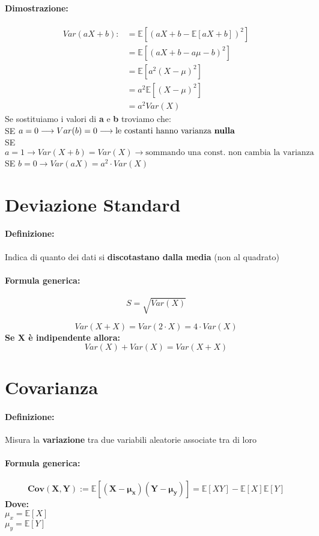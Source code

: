 \documentclass[]{article}
\newcommand{\ev}{\mathbb{E}[X]}
\renewcommand{\ev}[1]{\mathbb{E}[#1]}
\newcommand{\definizione}{\paragraph{Definizione:}}
\newcommand{\formula}{\paragraph{Formula generica:}}
\begin{document}
    \paragraph{Dimostrazione:}
    \begin{equation*}
        \begin{split}
            Var(aX + b) :&= \ev{(aX + b - \ev{aX + b})^2} \\
            & = \ev{(aX + b -a\mu - b)^2} \\
            & = \ev{a^2(X-\mu)^2} \\
            & = a^2 \ev{(X - \mu)^2} \\
            & = a^2 Var(X)
        \end{split}
    \end{equation*}
    Se sostituiamo i valori di \textbf{a} e \textbf{b} troviamo che: \\
    SE $a = 0 \longrightarrow Var(b) = 0 \longrightarrow \text{le costanti hanno varianza \textbf{nulla}}$ \\
    SE $a = 1 \longrightarrow Var(X + b) = Var(X) \longrightarrow \text{sommando una const. non cambia la varianza}$ \\
    SE $b = 0 \longrightarrow Var(aX) = a^2 \cdot Var(X)$ \\
    

    \newpage
    \section{Deviazione Standard}
    \definizione Indica di quanto dei dati si \textbf{discotastano dalla media} (non al quadrato)

    \formula \[ S = \sqrt{Var(X)} \]

    \[ Var(X + X) = Var(2 \cdot X) = 4 \cdot Var(X) \]
    \linebreak[1]
    \textbf{Se X è indipendente allora:}
    \[ Var(X) + Var(X) = Var(X + X) \]

    \section{Covarianza}
    \definizione Misura la \textbf{variazione} tra due variabili aleatorie associate tra di loro
    \formula \[ \boldsymbol{Cov(X,Y) := \ev{(X - \mu_x) (Y - \mu_y)}} = \ev{XY} - \ev{X} \ev{Y} \]
    \textbf{Dove:} \\
    $ \mu_x = \ev{X} $ \\
    $ \mu_y = \ev{Y} $
\end{document}
